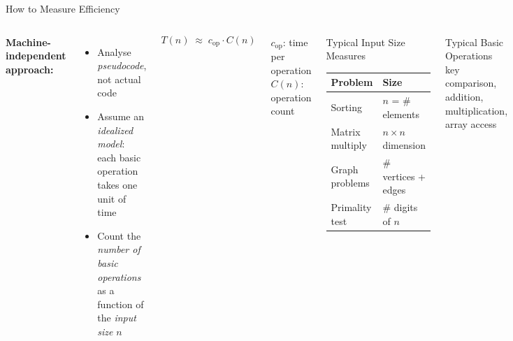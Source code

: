 \documentclass[aspectratio=169]{beamer}
\begin{document}
\begin{frame}[shrink=12]{How to Measure Efficiency}
  \begin{columns}[T]
      \textbf{Machine-independent approach:}
      \begin{itemize}
        \item Analyse \emph{pseudocode}, not actual code
        \item Assume an \emph{idealized model}: each basic operation
              takes one unit of time
        \item Count the \emph{number of basic operations} as a
              function of the \emph{input size} $n$
      \end{itemize}
      \vspace{0.3em}
      \[
        T(n) \;\approx\; c_{\text{op}} \cdot C(n)
      \]
      \begin{center}
        \small
        $c_{\text{op}}$: time per operation \quad
        $C(n)$: operation count
      \end{center}
      \begin{block}{Typical Input Size Measures}
        \begin{tabular}{ll}
          \toprule
          \textbf{Problem} & \textbf{Size} \\
          \midrule
          Sorting & $n$ = \# elements \\
          Matrix multiply & $n\times n$ dimension \\
          Graph problems & \# vertices + edges \\
          Primality test & \# digits of $n$ \\
          \bottomrule
        \end{tabular}
      \end{block}
      \vspace{0.3em}
      \begin{block}{Typical Basic Operations}
        key comparison, addition, multiplication,
        array access
      \end{block}
  \end{columns}
\end{frame}
\end{document}
